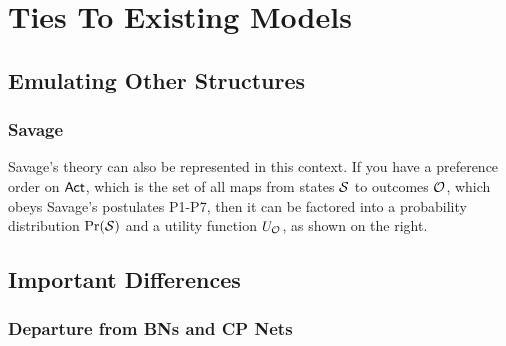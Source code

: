 \documentclass{article}
\begin{document}
	\section{Ties To Existing Models}
	
	\subsection{Emulating Other Structures}\label{sec:emulation}
	
	\subsubsection{Savage}
	\begin{minipage}{\linewidth-5.5cm}
		Savage's theory can also be represented in this context. If you have a preference order on $\sf Act$, which is the set of all maps from states $\cal S$ to outcomes $\cal O$, which obeys Savage's postulates P1-P7, then it can be factored into a probability distribution $\Pr(\cal S)$ and a utility function $U_{\cal O}$, as shown on the right.
	\end{minipage}\hfill
	\begin{minipage}{5cm}
	\end{minipage}
	
	\subsection{Important Differences}
	
	\subsubsection{Departure from BNs and CP Nets}
	
\end{document}
